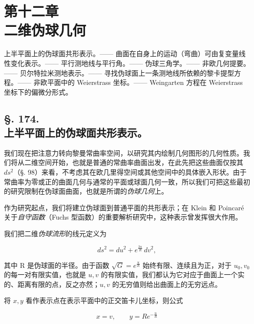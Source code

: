 \section*{第十二章\\ 二维伪球几何}



\begin{center}

\small

上半平面上的伪球面共形表示。—— 曲面在自身上的运动（弯曲）可由复变量线性变化表示。—— 平行测地线与平行角。—— 伪球三角学。—— 非欧几何提要。—— 贝尔特拉米测地表示。—— 寻找伪球面上一条测地线所依赖的黎卡提型方程。—— 非欧平面中的 Weierstrass 坐标。—— Weingarten 方程在 Weierstrass 坐标下的偏微分形式。

\end{center}



\subsection*{§. 174.\\ 上半平面上的伪球面共形表示。}



我们现在把注意力转向黎曼常曲率空间，以研究其内绘制几何图形的几何性质。我们将从二维空间开始，也就是普通的常曲率曲面出发，在此先把这些曲面仅按其 $ds^2$（§. 98）来看，不考虑其在欧几里得空间或其他空间中的具体嵌入形状。由于常曲率为零或正的曲面几何与通常的平面或球面几何一致，所以我们可把这些最初的研究限制在伪球面曲面，也就是所谓的\emph{伪球几何}上。



作为研究起点，我们将建立伪球面到普通平面的共形表示；在 Klein 和 Poincaré 关于\emph{自守函数}（Fuchs 型函数）的重要解析研究中，这种表示曾发挥很大作用。



我们把二维\emph{伪球流形}的线元定义为

\[
\tag{1}
 ds^2=du^2+e^{\frac{2u}{R}}\,dv^2,
\]

其中 R 是伪球面的半径。由于函数 \(\sqrt G=e^{\frac{u}{R}}\) 始终有限、连续且为正，对于 \(u_0,v_0\) 的每一对有限实值，也就是 \(u,v\) 的有限实值，我们都认为它对应于曲面上一个实的、距离有限的点，反之亦然；\(u,v\) 的无穷值则给出曲面上的无穷远点。



将 $x,y$ 看作表示点在表示平面中的正交笛卡儿坐标，则公式

\[
\tag{2}
 x=v,\qquad y=Re^{-\frac{u}{R}}
\]


